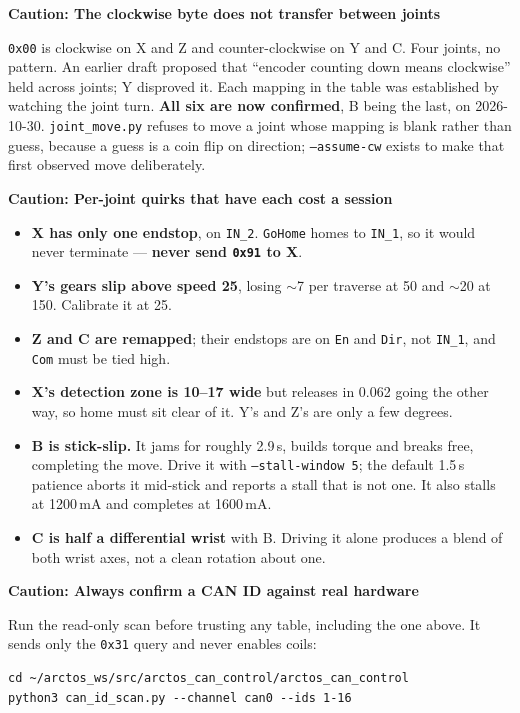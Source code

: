 \documentclass[11pt,letterpaper]{article}
\newenvironment{caution}[1]{%
    \par\addvspace{8pt}%
    \noindent{\color{cautionred}\rule{\linewidth}{0.8pt}}\par\vspace{2pt}
    \noindent\textbf{\color{cautionred}Caution: #1}\par\vspace{2pt}
}{%
    \par\vspace{2pt}\noindent{\color{cautionred}\rule{\linewidth}{0.4pt}}%
    \par\addvspace{8pt}%
}
\begin{document}
\begin{caution}{The clockwise byte does not transfer between joints}
\texttt{0x00} is clockwise on X and Z and counter-clockwise on Y and C. Four
joints, no pattern. An earlier draft proposed that ``encoder counting down means
clockwise'' held across joints; Y disproved it. Each mapping in the table was
established by watching the joint turn. \textbf{All six are now confirmed}, B being
the last, on 2026-10-30. \texttt{joint\_move.py} refuses to move a joint whose
mapping is blank rather than guess, because a guess is a coin flip on direction;
\texttt{--assume-cw} exists to make that first observed move deliberately.
\end{caution}

\begin{caution}{Per-joint quirks that have each cost a session}
\begin{itemize}
    \item \textbf{X has only one endstop}, on \texttt{IN\_2}. \texttt{GoHome}
    homes to \texttt{IN\_1}, so it would never terminate --- \textbf{never send
    \texttt{0x91} to X}.
    \item \textbf{Y's gears slip above speed 25}, losing $\sim$7\textdegree{}
    per traverse at 50 and $\sim$20\textdegree{} at 150. Calibrate it at 25.
    \item \textbf{Z and C are remapped}; their endstops are on \texttt{En} and
    \texttt{Dir}, not \texttt{IN\_1}, and \texttt{Com} must be tied high.
    \item \textbf{X's detection zone is 10--17\textdegree{} wide} but releases in
    0.062\textdegree{} going the other way, so home must sit clear of it. Y's and
    Z's are only a few degrees.
    \item \textbf{B is stick-slip.} It jams for roughly 2.9\,s, builds torque and
    breaks free, completing the move. Drive it with
    \texttt{--stall-window 5}; the default 1.5\,s patience aborts it mid-stick and
    reports a stall that is not one. It also stalls at 1200\,mA and completes at
    1600\,mA.
    \item \textbf{C is half a differential wrist} with B. Driving it alone produces
    a blend of both wrist axes, not a clean rotation about one.
\end{itemize}
\end{caution}

\begin{caution}{Always confirm a CAN ID against real hardware}
Run the read-only scan before trusting any table, including the one above. It sends
only the \texttt{0x31} query and never enables coils:
\begin{lstlisting}
cd ~/arctos_ws/src/arctos_can_control/arctos_can_control
python3 can_id_scan.py --channel can0 --ids 1-16
\end{lstlisting}
\end{caution}
\end{document}
